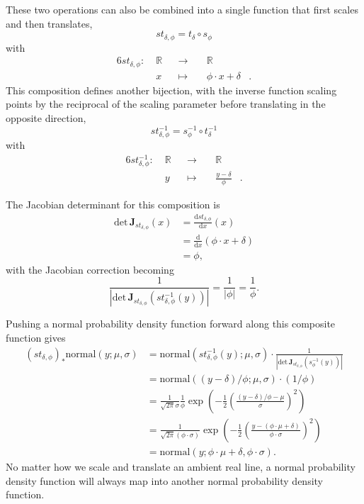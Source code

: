 \documentclass[
  letterpaper,
  DIV=11,
  numbers=noendperiod]{scrartcl}
\begin{document}
These two operations can also be combined into a single function that
first scales and then translates, \[
st_{\delta, \phi} = t_{\delta} \circ s_{\phi}
\] with \begin{alignat*}{6}
st_{\delta, \phi} :\; & \mathbb{R} & &\rightarrow& \; & \mathbb{R} &
\\
& x & &\mapsto& & \phi \cdot x + \delta &.
\end{alignat*} This composition defines another bijection, with the
inverse function scaling points by the reciprocal of the scaling
parameter before translating in the opposite direction, \[
st_{\delta, \phi}^{-1} = s_{\phi}^{-1} \circ t_{\delta}^{-1}
\] with \begin{alignat*}{6}
st_{\delta, \phi}^{-1} :\; & \mathbb{R} & &\rightarrow& \; & \mathbb{R} &
\\
& y & &\mapsto& & \frac{y - \delta}{\phi}  &.
\end{alignat*}

The Jacobian determinant for this composition is \begin{align*}
\mathrm{det} \, \mathbf{J}_{st_{\delta, \phi}}(x)
&= \frac{ \mathrm{d} st_{\delta, \phi} }{ \mathrm{d} x }(x)
\\
&= \frac{ \mathrm{d} }{ \mathrm{d} x } ( \phi \cdot x + \delta )
\\
&= \phi,
\end{align*} with the Jacobian correction becoming \[
\frac{1}
{| \mathrm{det} \, \mathbf{J}_{st_{\delta, \phi}}
(st_{\delta, \phi}^{-1}(y)) |}
=
\frac{1}{ | \phi | }
=
\frac{1}{ \phi }.
\]

Pushing a normal probability density function forward along this
composite function gives \begin{align*}
(st_{\delta, \phi})_{*} \mathrm{normal}(y; \mu, \sigma)
&=
\mathrm{normal}(st_{\delta, \phi}^{-1}(y); \mu, \sigma)
\cdot
\frac{1}
{|
  \mathrm{det} \, \mathbf{J}_{st_{\delta, \phi}}(s_{\phi}^{-1}(y))
|}
\\
&=
\mathrm{normal}( (y - \delta) / \phi ; \mu, \sigma) \cdot (1 / \phi)
\\
&= \frac{1}{\sqrt{2 \pi} \sigma} \frac{1}{ \phi }
\exp \left(
-\frac{1}{2}
\left( \frac{ (y - \delta) / \phi - \mu}{\sigma} \right)^{2}
\right)
\\
&= \frac{1}{\sqrt{2 \pi} (\phi \cdot \sigma)}
\exp \left(
-\frac{1}{2}
\left(
\frac{ y - (\phi \cdot \mu + \delta)}{\phi \cdot \sigma}
\right)^{2}
\right)
\\
&=
\mathrm{normal}(y; \phi \cdot \mu + \delta, \phi \cdot \sigma).
\end{align*} No matter how we scale and translate an ambient real line,
a normal probability density function will always map into another
normal probability density function.
\end{document}
